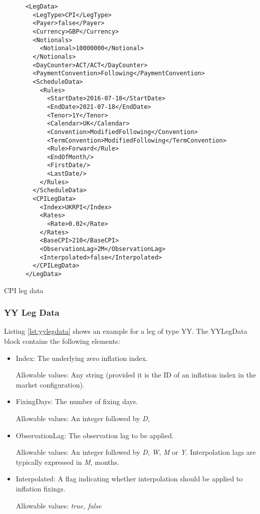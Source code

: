 \begin{listing}[H]
\begin{verbatim}
      <LegData>
        <LegType>CPI</LegType>
        <Payer>false</Payer>
        <Currency>GBP</Currency>
        <Notionals>
          <Notional>10000000</Notional>
        </Notionals>
        <DayCounter>ACT/ACT</DayCounter>
        <PaymentConvention>Following</PaymentConvention>
        <ScheduleData>
          <Rules>
            <StartDate>2016-07-18</StartDate>
            <EndDate>2021-07-18</EndDate>
            <Tenor>1Y</Tenor>
            <Calendar>UK</Calendar>
            <Convention>ModifiedFollowing</Convention>
            <TermConvention>ModifiedFollowing</TermConvention>
            <Rule>Forward</Rule>
            <EndOfMonth/>
            <FirstDate/>
            <LastDate/>
          </Rules>
        </ScheduleData>
        <CPILegData>
          <Index>UKRPI</Index>
          <Rates>
            <Rate>0.02</Rate>
          </Rates>
          <BaseCPI>210</BaseCPI>
          <ObservationLag>2M</ObservationLag>
          <Interpolated>false</Interpolated>
        </CPILegData>
      </LegData>
\end{verbatim}
\caption{CPI leg data}
\label{lst:cpilegdata}
\end{listing}

\subsubsection{YY Leg Data}
\label{ss:yylegdata}

Listing \ref{lst:yylegdata} shows an example for a leg of type YY. The YYLegData block contains the following
elements:

\begin{itemize}
\item Index: The underlying zero inflation index.

Allowable values:  Any string (provided it is the ID of an inflation index in the market configuration).
\item FixingDays: The number of fixing days.

Allowable values: An integer followed by \emph{D},
\item ObservationLag: The observation lag to be applied.

Allowable values: An integer followed by \emph{D}, \emph{W}, \emph{M} or \emph{Y}. Interpolation lags are typically expressed in \emph{M}, months.
\item Interpolated: A flag indicating whether interpolation should be applied to inflation fixings.

Allowable values:  \emph{true, false} 
\end{itemize}

